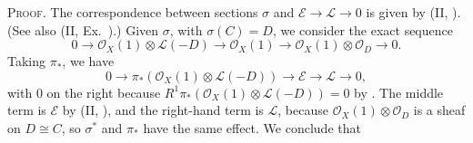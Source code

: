 {\smallskip
\noindent\textsc{Proof.} The correspondence between sections $\sigma$ and  $\mathcal E\to\mathcal L\to0$ is given by (II, ). (See also (II, Ex.~).) Given $\sigma$, with $\sigma(C)=D$, we consider the exact sequence
\[
0\to\mathcal O_X(1)\otimes\mathcal L(-D)\to\mathcal O_X(1)\to\mathcal O_X(1)\otimes\mathcal O_D\to0.
\]
Taking $\pi_*$, we have
\[
0\to\pi_*(\mathcal O_X(1)\otimes\mathcal L(-D))\to\mathcal E\to\mathcal L\to0,
\]
with $0$ on the right because $R^1\pi_*(\mathcal O_X(1)\otimes\mathcal L(-D))=0$ by . The middle term is $\mathcal E$ by (II, ), and the right-hand term is $\mathcal L$, because $\mathcal O_X(1)\otimes\mathcal O_D$ is a sheaf on $D\cong C$, so $\sigma^*$ and $\pi_*$ have the same effect. We conclude that
}
